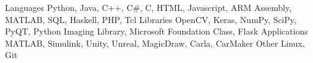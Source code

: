 
\begin{cvskills}
  \cvskill
    {Languages} %
    {Python, Java, C++, C\#, C, HTML, Javascript, ARM Assembly, MATLAB, SQL, Haskell, PHP, Tcl} %
  \cvskill
    {Libraries} %
    {OpenCV, Keras, NumPy, SciPy, PyQT, Python Imaging Library, Microsoft Foundation Class, Flask} %
  \cvskill
    {Applications} %
    {MATLAB, Simulink, Unity, Unreal, MagicDraw, Carla, CarMaker} %
  \cvskill
    {Other} 
    {Linux, Git}
\end{cvskills}
